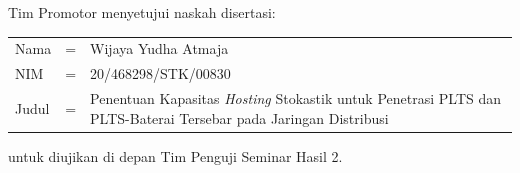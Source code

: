 {}
\vspace*{8pt}

\BgThispage

\noindent Tim Promotor menyetujui naskah disertasi:
\vspace*{-8pt}
{
\begin{longtable}{llp{340pt}}
	\hspace*{-6pt}Nama						& = & Wijaya Yudha Atmaja\\
	\hspace*{-6pt}NIM							& = & 20/468298/STK/00830\\
	\hspace*{-6pt}Judul	& = & Penentuan Kapasitas \textit{Hosting} Stokastik untuk Penetrasi PLTS dan PLTS-Baterai Tersebar pada Jaringan Distribusi
\end{longtable}
}
\vspace*{-22pt}
\noindent untuk diujikan di depan Tim Penguji Seminar Hasil 2.
\vspace*{5cm}

